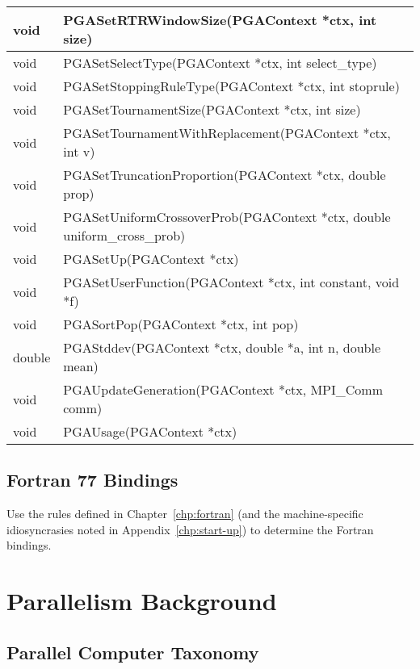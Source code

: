 \documentclass{report}
\begin{document}
\begin{tabular}{|l|l|}
void &  PGASetRTRWindowSize(PGAContext *ctx, int size) \\ \hline
void &  PGASetSelectType(PGAContext *ctx, int select\_type) \\ \hline
void &  PGASetStoppingRuleType(PGAContext *ctx, int stoprule) \\ \hline
void &  PGASetTournamentSize(PGAContext *ctx, int size) \\ \hline
void &  PGASetTournamentWithReplacement(PGAContext *ctx, int v) \\ \hline
void &  PGASetTruncationProportion(PGAContext *ctx, double prop) \\ \hline
void &  PGASetUniformCrossoverProb(PGAContext *ctx, double uniform\_cross\_prob)
\\ \hline
void &  PGASetUp(PGAContext *ctx) \\ \hline
void &  PGASetUserFunction(PGAContext *ctx, int constant, void *f) \\ \hline
void &  PGASortPop(PGAContext *ctx, int pop) \\ \hline
double &  PGAStddev(PGAContext *ctx, double *a, int n, double mean) \\ \hline
void &  PGAUpdateGeneration(PGAContext *ctx, MPI\_Comm comm) \\ \hline
void &  PGAUsage(PGAContext *ctx) \\ \hline
\end{tabular}


\section*{Fortran 77 Bindings}\label{app:bindings-fortran}

Use the rules defined in Chapter~\ref{chp:fortran} (and the machine-specific
idiosyncrasies noted in Appendix~\ref{chp:start-up}) to determine the Fortran
bindings.

\chapter{Parallelism Background}\label{app:par-background}

\section*{Parallel Computer Taxonomy}
\end{document}
